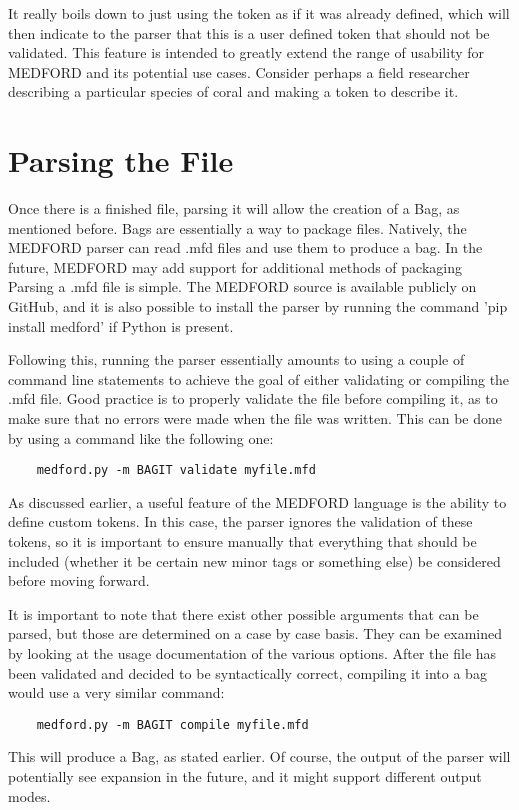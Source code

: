 \documentclass[]{article}%
\begin{document}
It really boils down to just using the token as if it was already defined, which will then indicate to the parser that this is a user defined token that should not be validated. This feature is intended to greatly extend the range of usability for MEDFORD and its potential use cases. Consider perhaps a field researcher describing a particular species of coral and making a token to describe it.

\section{Parsing the File}


Once there is a finished file, parsing it will allow the creation of a Bag, as mentioned before. Bags are essentially a way to package files. Natively, the MEDFORD parser can read .mfd files and use them to produce a bag. In the future, MEDFORD may add support for additional methods of packaging
Parsing a .mfd file is simple. The MEDFORD source is available publicly on GitHub, and it is also possible to install the parser by running the command 'pip install medford' if Python is present.

Following this, running the parser essentially amounts to using a couple of command line statements to achieve the goal of either validating or compiling the .mfd file. Good practice is to properly validate the file before compiling it, as to make sure that no errors were made when the file was written. This can be done by using a command like the following one:
\begin{verbatim}
    medford.py -m BAGIT validate myfile.mfd
\end{verbatim}

As discussed earlier, a useful feature of the MEDFORD language is the ability to define custom tokens. In this case, the parser ignores the validation of these tokens, so it is important to ensure manually that everything that should be included (whether it be certain new minor tags or something else) be considered before moving forward.

It is important to note that there exist other possible arguments that can be parsed, but those are determined on a case by case basis. They can be examined by looking at the usage documentation of the various options. After the file has been validated and decided to be syntactically correct, compiling it into a bag would use a very similar command:
\begin{verbatim}
    medford.py -m BAGIT compile myfile.mfd
\end{verbatim}
This will produce a Bag, as stated earlier. Of course, the output of the parser will potentially see expansion in the future, and it might support different output modes. 
\end{document}
